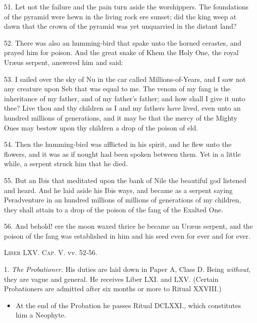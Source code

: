 {
\raggedbottom
{}


51. Let not the failure and the pain turn aside the worshippers. The
foundations of the pyramid were hewn in the living rock ere sunset; did the
king weep at dawn that the crown of the pyramid was yet unquarried in the
distant land?

52. There was also an humming-bird that spake unto the horned cerastes,
and prayed him for poison. And the great snake of Khem the Holy One, the
royal Ur\ae{}us serpent, answered him and said:

53. I sailed over the sky of Nu in the car called Millions-of-Years, and I saw
not any creature upon Seb that was equal to me. The venom of my fang is
the inheritance of my father, and of my father's father; and how shall I give
it unto thee? Live thou and thy children as I and my fathers have lived, even
unto an hundred millions of generations, and it may be that the mercy of the
Mighty Ones may bestow upon thy children a drop of the poison of eld.

54. Then the humming-bird was afflicted in his spirit, and he flew unto the flowers, and it was as if nought had been spoken between them. Yet in a little while, a serpent struck him that he died.

55. But an Ibis that meditated upon the bank of Nile the beautiful god
listened and heard. And he laid aside his Ibis ways, and became as a serpent
saying Peradventure in an hundred millions of millions of generations of my
children, they shall attain to a drop of the poison of the fang of the Exalted
One.

56. And behold! ere the moon waxed thrice he became an Ur\ae{}us serpent, and the poison of the fang was established in him and his seed even for ever and for ever.

{\raggedleft\textemdash{} \textsc{Liber LXV. Cap. V.} vv. 52-56.\par}
}

\pagebreak

1. \textit{The Probationer.} His duties are laid down in Paper A, Class D. Being \textit{without}, they are vague and general. He receives Liber LXI. and LXV. (Certain Probationers are admitted after six months or more to Ritual XXVIII.)
\begin{itemize}
\item At the end of the Probation he passes Ritual DCLXXI., which constitutes him a Neophyte.
\end{itemize}


